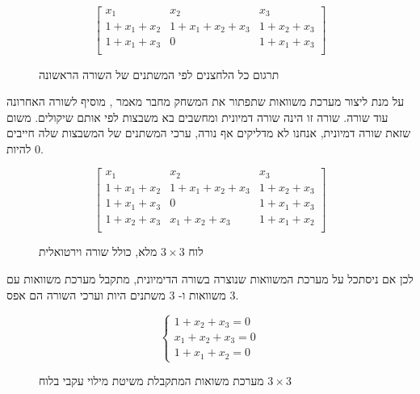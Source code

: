 \documentclass[12pt,leqno]{article}
\theoremstyle{theoremdd}
\begin{document}
\begin{figure}[ht]
    \caption{
        תרגום כל הלחצנים לפי המשתנים של השורה הראשונה
    }
    \label{fig: 3 x 3 board fill intire board}
    \centering
    \[
    \begin{bmatrix}
        x_1 & x_2 & x_3 \\
        1 + x_1 + x_2 & 1 + x_1 + x_2 + x_3 & 1 + x_2 + x_3 \\
        1 + x_1 + x_3 & 0 & 1 + x_1 + x_3 \\
    \end{bmatrix}
    \]
\end{figure}

על מנת ליצור מערכת משוואות
שתפתור את המשחק
מחבר מאמר
\cite{B1},
מוסיף לשורה האחרונה עוד שורה.
שורה זו הינה
שורה דמיונית ומחשבים בא משבצות
לפי אותם שיקולים.
משום שזאת שורה דמיונית, 
אנחנו לא מדליקים אף נורה, ערכי המשתנים של המשבצות
שלה חייבים להיות
$0$.

\begin{figure}[ht]
    \caption{לוח 
    $3 \times 3$
    מלא,
    כולל שורה וירטואלית
    }
    \label{fig: 3 x 3 board fill with virtual}
    \centering
    \[
        \begin{bmatrix}
            x_1 & x_2 & x_3 \\
            1 + x_1 + x_2 & 1 + x_1 + x_2 + x_3 & 1 + x_2 + x_3 \\
            1 + x_1 + x_3 & 0 & 1 + x_1 + x_3 \\
            \hline
            1 + x_2 + x_3 & x_1 + x_2 + x_3 & 1 + x_1 + x_2 \\
        \end{bmatrix}
    \]
\end{figure}

לכן אם ניסתכל על
מערכת המשוואות 
שנוצרה בשורה הדימיונית,
מתקבל מערכת משוואות עם 
$3$
משוואות ו- 
$3$
משתנים
היות
וערכי השורה הם אפס.

\begin{figure}[ht]
    \caption{
        מערכת משואות המתקבלת משיטת מילוי עקבי
        בלוח 
        $3 \times 3$
    }
    \label{fig: eq system for spanish method 3 x 3}
    
    \[\begin{cases}
        1+x_{2}+x_{3}=0\\
        x_1 + x_2 + x_3 = 0\\
        1 + x_1 + x_2 = 0
        \end{cases} \]
\end{figure}
\end{document}
